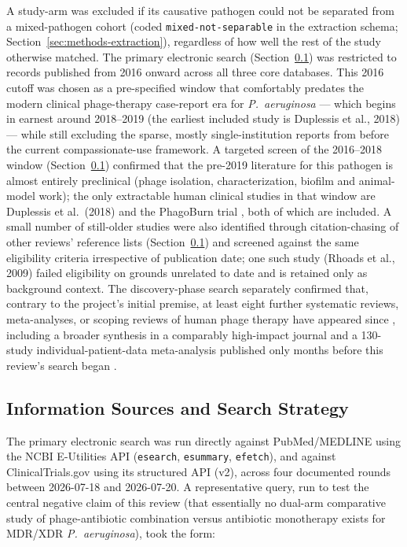 A study-arm was excluded if its causative pathogen could not be separated from a mixed-pathogen cohort (coded \texttt{mixed-not-separable} in the extraction schema; Section~\ref{sec:methods-extraction}), regardless of how well the rest of the study otherwise matched. The primary electronic search (Section~\ref{sec:methods-search}) was restricted to records published from 2016 onward across all three core databases. This 2016 cutoff was chosen as a pre-specified window that comfortably predates the modern clinical phage-therapy case-report era for \textit{P.\ aeruginosa} --- which begins in earnest around 2018--2019 (the earliest included study is Duplessis et al., 2018) --- while still excluding the sparse, mostly single-institution reports from before the current compassionate-use framework. A targeted screen of the 2016--2018 window (Section~\ref{sec:methods-search}) confirmed that the pre-2019 literature for this pathogen is almost entirely preclinical (phage isolation, characterization, biofilm and animal-model work); the only extractable human clinical studies in that window are Duplessis et al.\ (2018) and the PhagoBurn trial \parencite{Jault2019_phagoburn}, both of which are included. A small number of still-older studies were also identified through citation-chasing of other reviews' reference lists (Section~\ref{sec:methods-search}) and screened against the same eligibility criteria irrespective of publication date; one such study (Rhoads et al., 2009) failed eligibility on grounds unrelated to date and is retained only as background context. The discovery-phase search separately confirmed that, contrary to the project's initial premise, at least eight further systematic reviews, meta-analyses, or scoping reviews of human phage therapy have appeared since \textcite{ElHaddad2019_eskape}, including a broader synthesis in a comparably high-impact journal \parencite{Uyttebroek2022_lancetid} and a 130-study individual-patient-data meta-analysis published only months before this review's search began \parencite{Liu2025_ijaa}.

\subsection{Information Sources and Search Strategy}
\label{sec:methods-search}

The primary electronic search was run directly against PubMed/MEDLINE using the NCBI E-Utilities API (\texttt{esearch}, \texttt{esummary}, \texttt{efetch}), and against ClinicalTrials.gov using its structured API (v2), across four documented rounds between 2026-07-18 and 2026-07-20. A representative query, run to test the central negative claim of this review (that essentially no dual-arm comparative study of phage-antibiotic combination versus antibiotic monotherapy exists for MDR/XDR \textit{P.\ aeruginosa}), took the form:

